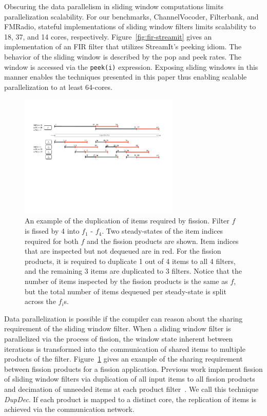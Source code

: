Obscuring the data parallelism in sliding window computations limits
parallelization scalability.  For our benchmarks, ChannelVocoder,
Filterbank, and FMRadio, stateful implementations of sliding window
filters limits scalability to 18, 37, and 14 cores, respectively.
Figure~\ref{fig:fir-streamit} gives an implementation of an FIR filter
that utilizes StreamIt's peeking idiom.  The behavior of the sliding
window is described by the pop and peek rates.  The window is accessed
via the {\tt peek(i)} expression.  Exposing sliding windows in this
manner enables the techniques presented in this paper thus enabling
scalable parallelization to at least 64-cores.


\begin{figure}[t]
\centering
\includegraphics[width=3.0in]{figures/fission-sharing.pdf}
\caption[An example of the sharing required by fission.]  { An
  example of the duplication of items required by fission.  Filter $f$
  is fissed by 4 into $f_1$ - $f_4$.  Two steady-states of the item
  indices required for both $f$ and the fission products are shown.
  Item indices that are inspected but not dequeued are in red.  For the
  fission products, it is required to duplicate 1 out of 4 items to
  all 4 filters, and the remaining 3 items are duplicated to 3
  filters.  Notice that the number of items inspected by the fission
  products is the same as $f$, but the total number of items dequeued 
per steady-state is split across the $f_i$s.
\label{fig:fission-sharing}}
\end{figure}

Data parallelization is possible if the compiler can reason about the
sharing requirement of the sliding window filter.  When a sliding
window filter is parallelized via the process of fission, the window
state inherent between iterations is transformed into the
communication of shared items to multiple products of the filter.
Figure~\ref{fig:fission-sharing} gives an example of the sharing
requirement between fission products for a fission application. 
Previous work implement fission of sliding window filters via
duplication of all input items to all fission products and decimation
of unneeded items at each product filter~\cite{streamit-asplos}.  We
call this technique {\it DupDec}. If each product is mapped to a
distinct core, the replication of items is achieved via the
communication network.

